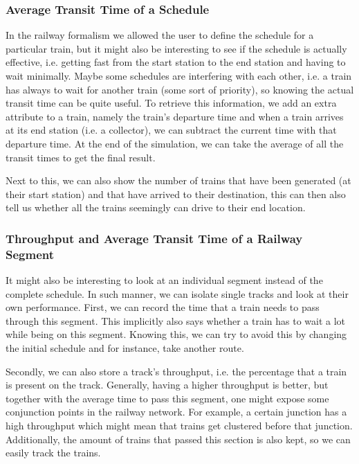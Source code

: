\documentclass{article}
\begin{document}
\subsubsection{Average Transit Time of a Schedule}

In the railway formalism we allowed the user to define the schedule for a particular train, but it might also be interesting to see if the schedule is actually effective, i.e. getting fast from the start station to the end station and having to wait minimally. Maybe some schedules are interfering with each other, i.e. a train has always to wait for another train (some sort of priority), so knowing the actual transit time can be quite useful. To retrieve this information, we add an extra attribute to a train, namely the train's departure time and when a train arrives at its end station (i.e. a collector), we can subtract the current time with that departure time. At the end of the simulation, we can take the average of all the transit times to get the final result.

Next to this, we can also show the number of trains that have been generated (at their start station) and that have arrived to their destination, this can then also tell us whether all the trains seemingly can drive to their end location.

\subsubsection{Throughput and Average Transit Time of a Railway Segment}

It might also be interesting to look at an individual segment instead of the complete schedule. In such manner, we can isolate single tracks and look at their own performance. First, we can record the time that a train needs to pass through this segment. This implicitly also says whether a train has to wait a lot while being on this segment. Knowing this, we can try to avoid this by changing the initial schedule and for instance, take another route.

Secondly, we can also store a track's throughput, i.e. the percentage that a train is present on the track. Generally, having a higher throughput is better, but together with the average time to pass this segment, one might expose some conjunction points in the railway network. For example, a certain junction has a high throughput which might mean that trains get clustered before that junction. Additionally, the amount of trains that passed this section is also kept, so we can easily track the trains.
\end{document}
